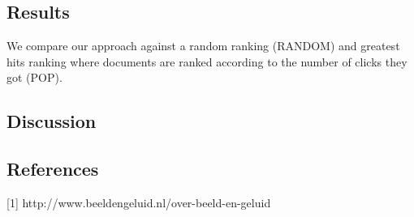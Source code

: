 \documentclass[12pt]{amsart}
\begin{document}
\subsection{Results}
We compare our approach against a random ranking (RANDOM) and greatest hits ranking where documents are ranked according to the number of clicks they got (POP).
\subsection{Discussion}

\subsection{References}
[1] http://www.beeldengeluid.nl/over-beeld-en-geluid
\end{document}
